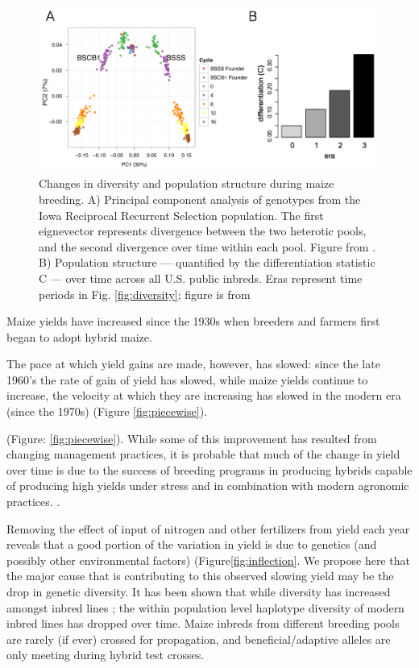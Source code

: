 \documentclass[12pt]{article}
\begin{document}
\begin{figure}
\includegraphics[width=\linewidth]{joostgerke.png}
\caption{Changes in diversity and population structure during maize breeding.  
A) Principal component analysis of genotypes from the Iowa Reciprocal Recurrent Selection population. The first eignevector represents divergence between the two heterotic pools, and the second divergence over time within each pool. Figure from \citet{Gerke:2013tw}. 
B) Population structure --- quantified by the differentiation statistic C --- over time across all U.S. public inbreds. Eras represent time periods in Fig. \ref{fig:diversity}; figure is from \citep{van2012historical} } 
\label{fig:pca}
\end{figure}


Maize yields have increased since the 1930s when breeders and farmers first began to adopt hybrid maize.

The pace at which yield gains are made, however, has slowed: since the late 1960's the rate of gain of yield has slowed, while maize yields continue to increase, the velocity at which they are increasing has slowed in the modern era (since the 1970s) (Figure \ref{fig:piecewise}). 

 (Figure: \ref{fig:piecewise}).
While some of this improvement has resulted from changing management practices, it is probable that much of the change in yield over time is due to the success of breeding programs in producing hybrids capable of producing high yields under stress and in combination with modern agronomic practices.  \citep{Duvick:2001fy}. 

Removing the effect of input of nitrogen and other fertilizers from yield each year reveals that a good portion of the variation in yield is due to genetics (and possibly other environmental factors) (Figure\ref{fig:inflection}. 
We propose here that the major cause that is contributing to this observed slowing yield may be the drop in genetic diversity. 
It has been shown that while diversity has increased amongst inbred lines \citep{Gerke:2013tw}; the within population level haplotype diversity of modern inbred lines \citep{van2012historical} has dropped over time. 
%
%
Maize inbreds from different breeding pools are rarely (if ever) crossed for propagation, and beneficial/adaptive alleles are only meeting during hybrid test crosses. 
\end{document}
